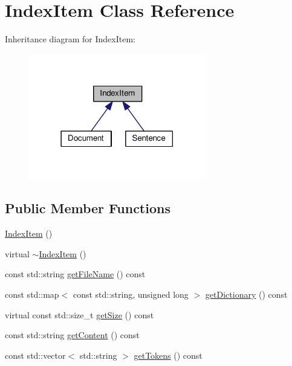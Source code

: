 \hypertarget{classIndexItem}{}\section{Index\+Item Class Reference}
\label{classIndexItem}


Inheritance diagram for Index\+Item\+:\nopagebreak
\begin{figure}[H]
\begin{center}
\leavevmode
\includegraphics[width=218pt]{classIndexItem__inherit__graph}
\end{center}
\end{figure}
\subsection*{Public Member Functions}
\begin{DoxyCompactItemize}
\item 
\hyperlink{classIndexItem_aa37a5377a9cdd5993b09baad3d842a6f}{Index\+Item} ()
\item 
virtual \hyperlink{classIndexItem_a6225b6cb69e5dc134d2a7cea952cdd17}{$\sim$\+Index\+Item} ()
\item 
const std\+::string \hyperlink{classIndexItem_a269c754227e606efd271bea3e56701f8}{get\+File\+Name} () const
\item 
const std\+::map$<$ const std\+::string, unsigned long $>$ \hyperlink{classIndexItem_a08880ba5d6f18be5b08184df13f37e9f}{get\+Dictionary} () const
\item 
virtual const std\+::size\+\_\+t \hyperlink{classIndexItem_a37bb9320946eedfe8360bc740eb0c11b}{get\+Size} () const
\item 
const std\+::string \hyperlink{classIndexItem_a0cc1631297cb3859a2faecda7062805b}{get\+Content} () const
\item 
const std\+::vector$<$ std\+::string $>$ \hyperlink{classIndexItem_ae37a9af94cfcc8f76fd3081b8096b31a}{get\+Tokens} () const
\end{DoxyCompactItemize}
